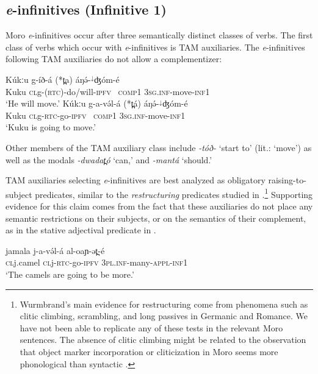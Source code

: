 \subsection{\textit{e}-infinitives (Infinitive 1)\label{einf}}

Moro \textit{e}-infinitives occur after three semantically distinct classes of verbs. The first class of verbs which occur with \textit{e}-infinitives is TAM auxiliaries. The \textit{e}-infinitives following TAM auxiliaries do not allow a complementizer:

\ea \ea  \gll  Kúkːu g-íð-á (*t̪a) áŋə́-$^{↓}$ʤóm-{é}\\
Kuku \textsc{cl}g-(\textsc{rtc})-do/will-\textsc{ipfv} {\ \textsc{comp1}} \textsc{3sg.inf}-move-\textsc{inf1}\\
\glt ‘He will move.’
\ex  \gll  Kúkːu g-a-və́l-á (*t̪á) áŋə́-$^{↓}$ʤóm-{é} \\
Kuku \textsc{cl}g-\textsc{rtc}-go-\textsc{ipfv} {\ \textsc{comp1}} \textsc{3sg.inf}-move-\textsc{inf1}\\
\glt ‘Kuku is going to move.'
\z 
\z 

Other members of the TAM auxiliary class include \textit{-tóð-} `start to' (lit.: `move') as well as the modals \textit{-dwadat̪ó} `can,' and \textit{-mantá} `should.'

TAM auxiliaries selecting \textit{e}-infinitives are best analyzed as obligatory raising-to-subject predicates, similar to the \textit{restructuring} predicates studied in \citep{wurm03}.\footnote{Wurmbrand's main evidence for restructuring come from phenomena such as clitic climbing, scrambling, and long passives in Germanic and Romance. We have not been able to replicate any of these tests in the relevant Moro sentences. The absence of clitic climbing might be related to the observation that object marker incorporation or cliticization in Moro seems more phonological than syntactic \citep{jenks15}.} Supporting evidence for this claim comes from the fact that these auxiliaries do not place any semantic restrictions on their subjects, or on the semantics of their complement, as in the stative adjectival predicate in . 

\ea \gll jamala j-a-və́l-á al-oaɲ-ət̪-é\\
\textsc{cl}j.camel \textsc{cl}j-\textsc{rtc}-go-\textsc{ipfv} \textsc{3pl.inf}-many-\textsc{appl}-\textsc{inf1}\\
\glt ‘The camels are going to be more.' \label{ex:ch15:camels1}
\z 

